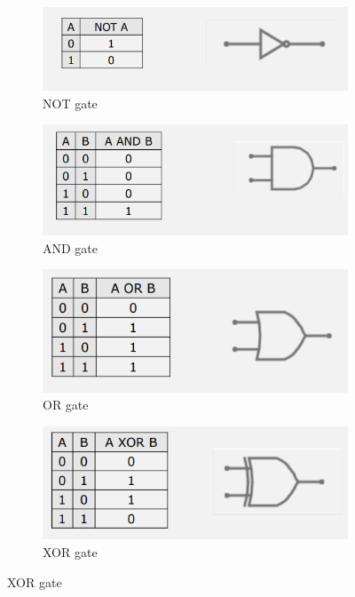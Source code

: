 \documentclass{article}
\begin{document}
\begin{figure}[h!]

    \centering
    \begin{subfigure}{.4\textwidth}
        \centering
        \includegraphics[width=\linewidth]{IM_NOT.PNG}
        \caption{NOT gate}
        \label{NOT}
    \end{subfigure}
    \hfill
    \begin{subfigure}{.4\textwidth}
        \centering
        \includegraphics[width=\linewidth]{IM_AND.PNG}
        \caption{AND gate}
        \label{AND}        
    \end{subfigure}
    
    \centering
    \begin{subfigure}{.4\textwidth}
        \centering
        \includegraphics[width=\linewidth]{IM_OR.PNG}
        \caption{OR gate}
        \label{OR}
    \end{subfigure}
    \hfill
    \begin{subfigure}{.4\textwidth}
        \centering
        \includegraphics[width=\linewidth]{IM_XOR.PNG}
        \caption{XOR gate}
        \label{XOR}        
    \end{subfigure}
    

\end{figure}
\end{document}
